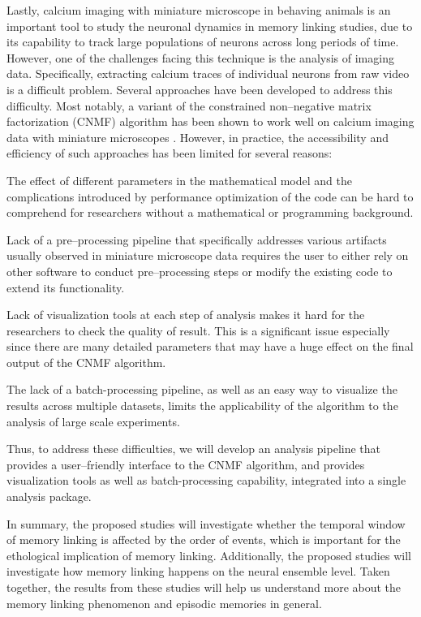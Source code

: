 \documentclass[master.tex]{subfiles}
\begin{document}
Lastly, calcium imaging with miniature microscope in behaving animals is an
important tool to study the neuronal dynamics in memory linking studies, due to
its capability to track large populations of neurons across long periods of
time. However, one of the challenges facing this technique is the analysis of
imaging data. Specifically, extracting calcium traces of individual neurons from
raw video is a difficult problem. Several approaches have been developed to
address this difficulty. Most notably, a variant of the constrained
non--negative matrix factorization (CNMF) algorithm has been shown to work well
on calcium imaging data with miniature microscopes
\cite{pnevmatikakis_simultaneous_2016, zhou_efficient_2016}. However, in
practice, the accessibility and efficiency of such approaches has been limited
for several reasons:
\begin{inparaenum}[a)]
\item The effect of different parameters in the mathematical model and the
  complications introduced by performance optimization of the code can be hard
  to comprehend for researchers without a mathematical or programming
  background.
\item Lack of a pre--processing pipeline that specifically addresses various
  artifacts usually observed in miniature microscope data requires the user to
  either rely on other software to conduct pre--processing steps or modify the
  existing code to extend its functionality.
\item Lack of visualization tools at each step of analysis makes it hard for the
  researchers to check the quality of result. This is a significant issue
  especially since there are many detailed parameters that may have a huge
  effect on the final output of the CNMF algorithm.
\item The lack of a batch-processing pipeline, as well as an easy way to
  visualize the results across multiple datasets, limits the applicability of
  the algorithm to the analysis of large scale experiments.
\end{inparaenum}
Thus, to address these difficulties, we will develop an analysis pipeline that
provides a user--friendly interface to the CNMF algorithm, and provides
visualization tools as well as batch-processing capability, integrated into a
single analysis package.

In summary, the proposed studies will investigate whether the temporal window of
memory linking is affected by the order of events, which is important for the
ethological implication of memory linking. Additionally, the proposed studies
will investigate how memory linking happens on the neural ensemble level. Taken
together, the results from these studies will help us understand more about the
memory linking phenomenon and episodic memories in general.
\end{document}
